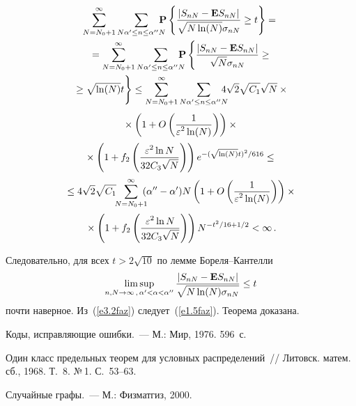 \begin{multicols}{2}
\begin{multline*}
\sum\limits_{N=N_0+1}^{\infty}\sum\limits_{N \alpha'\le n\le
\alpha^{\prime\prime}N}
\!\!\!\!\!\P\left\{\fr{|S_{nN}-{\E}S_{nN}|}{\sqrt{N\ln(N)}\sigma_{nN}}\ge
t\right\} = {}\\
{}=
\sum\limits_{N=N_0+1}^{\infty}\sum\limits_{N \alpha'\le
n\le \alpha^{\prime\prime}N}
\!\!\!\!\!\P\left\{\fr{|S_{nN}-{\E}S_{nN}|}{\sqrt{N}\sigma_{nN}}\ge\right.{}\\
\left.{}\ge
 \sqrt{\ln(N)}t
\vphantom{\fr{|S_{nN}-{\E}S_{nN}|}{\sqrt{N}\sigma_{nN}}}
\right\}\le
\sum_{N=N_0+1}^{\infty}\sum\limits_{N \alpha'\le n\le
\alpha^{\prime\prime}N}
\!\!\!\!\!4\sqrt{2}\sqrt{C_1}\sqrt{N}\times{}
\end{multline*}
\begin{multline*}
{}\times \left(1+O\left(\displaystyle\frac{\displaystyle 1\mathstrut}{\displaystyle \varepsilon^2\ln(N)\mathstrut}\right)
\right)\times{}\\[2pt]
{}\times
\left(1+f_2\left(\displaystyle\frac{\displaystyle \varepsilon^2\ln{N}\mathstrut}{\displaystyle 32C_3\sqrt{N}\mathstrut}\right)\right)e^{-{(\sqrt{\ln(N)}t)^2}/616}\le{}\\[2pt]
{}
\le 4\sqrt{2}\sqrt{C_1}\! \!\sum_{N=N_0+1}^{\infty}\!\!\!( \alpha^{\prime\prime}-
\alpha')N\left(1+O\left(\displaystyle\frac{\displaystyle 1\mathstrut}{\displaystyle \varepsilon^2\ln(N)\mathstrut}\right) \right)\times{}\\[2pt]
{}\times
\left(1+f_2\left(\displaystyle\frac{\displaystyle \varepsilon^2\ln{N}\mathstrut}{\displaystyle 32C_3\sqrt{N}\mathstrut}\right)\right)
N^{-t^2/16+{1}/2}<\infty\,.
 \end{multline*}
 
 \noindent
Следовательно, для всех $t>2\sqrt{10}$  по лемме Бо\-ре\-ля--Кан\-тел\-ли
\begin{equation}
\limsup_{n,N\to\infty\,,\,\alpha'<\alpha<
\alpha^{\prime\prime}}\displaystyle\frac{\displaystyle |S_{nN}-{{\bf E}}S_{nN}|\mathstrut}{\displaystyle \sqrt{N\ln(N)\sigma_{nN}}\mathstrut}\le t
\label{e3.2faz}
\end{equation}
почти наверное. Из~(\ref{e3.2faz}) следует~(\ref{e1.5faz}). Теорема доказана.


{\small\frenchspacing
{%
\begin{thebibliography}{9}

Коды, исправляющие ошибки.~--- М.: Мир, 1976. 596~с.

Один класс предельных теорем для условных распределений~// Литовск. матем. сб., 1968. Т.~8. №\,1. С.~53--63.

 Случайные графы.~--- М.: Физматгиз, 2000.


\end{thebibliography}}}
\end{multicols}
